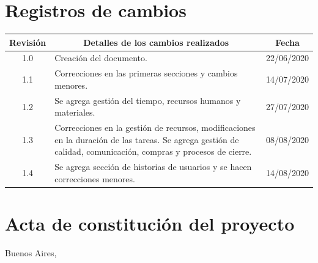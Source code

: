 \documentclass[11pt]{charter}
\begin{document}
\maketitle
\thispagestyle{empty}
\pagebreak

\thispagestyle{empty}
{\setlength{\parskip}{0pt}
\tableofcontents{}
}
\pagebreak

\section{Registros de cambios}
\label{sec:registro}

\begin{table}[ht]
\label{tab:registro}
\centering

\begin{tabularx}{\linewidth}{@{}|c|X|c|@{}}
\hline
\rowcolor[HTML]{C0C0C0} 
Revisión & \multicolumn{1}{c|}{\cellcolor[HTML]{C0C0C0}Detalles de los cambios realizados}     & Fecha      \\ \hline
1.0      & Creación del documento.                                                             & 22/06/2020 \\ \hline
1.1      & Correcciones en las primeras secciones y cambios menores.                           & 14/07/2020 \\ \hline
1.2      & Se agrega gestión del tiempo, recursos humanos y materiales.                        & 27/07/2020 \\ \hline
1.3      & Correcciones en la gestión de recursos, modificaciones en la duración de las tareas.
           Se agrega gestión de calidad, comunicación, compras y procesos de cierre.           & 08/08/2020 \\ \hline
1.4      & Se agrega sección de historias de usuarios y se hacen correcciones menores.         & 14/08/2020 \\ \hline
\end{tabularx}
\end{table}

\pagebreak

\section{Acta de constitución del proyecto}
\label{sec:acta}

\begin{flushright}
Buenos Aires, \fechaInicioName
\end{flushright}

\vspace{2cm}
\end{document}
